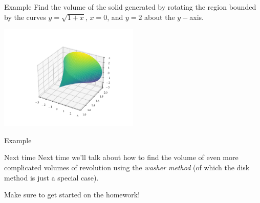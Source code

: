 \documentclass[presentation]{beamer}
\begin{document}
\begin{frame}[label={sec:orgaa01b44}]{Example}
Find the volume of the solid generated by rotating the region bounded
by the curves \(y = \sqrt{1 + x}\), \(x = 0\), and \(y = 2\) about
the \(y-\)axis.

\begin{center}
\includegraphics[width=0.5\textwidth]{../img/day006-ex03.png}
\end{center}
\vspace{10in}
\end{frame}

\begin{frame}[label={sec:org0e90eac}]{Example}
\end{frame}

\begin{frame}[label={sec:org5c019f9}]{Next time}
Next time we'll talk about how to find the volume of even more
complicated volumes of revolution using the \emph{washer method} (of which
the disk method is just a special case).

Make sure to get started on the homework!
\end{frame}
\end{document}
